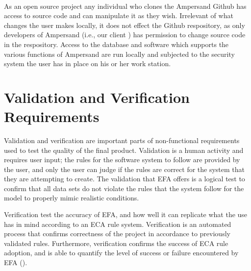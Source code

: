 \documentclass[12pt]{report}
\begin{document}
\paragraph*{}
As an open source project any individual who clones the Ampersand Github has access to source code 
and can manipulate it as they wish. Irrelevant of what changes the user makes locally, it does not 
effect the Github respository, as only developers of Ampersand \big(i.e., our client \big) has 
permission to change source code in the respository. Access to the database and software which 
supports the various functions of Ampersand are run locally and subjected to the security system 
the user has in place on his or her work station.

\section{Validation and Verification Requirements}\label{sec:Verification}

\paragraph*{}
Validation and verification are important parts of non-functional requirements used to test the 
quality of the final product. Validation is a human activity and requires user input; the rules for 
the software system to follow are provided by the user, and only the user can judge if the rules 
are correct for the system that they are attempting to create. The validation that EFA offers is 
a logical test to confirm that all data sets do not violate the rules that the system follow for 
the model to properly mimic realistic conditions. 

Verification test the accuracy of EFA, and how well it can replicate what the use has in mind 
according to an ECA rule system. Verification is an automated process that confirms correctness 
of the project in accordance to previously validated rules. Furthermore, verification confirms the 
success of ECA rule adoption, and is able to quantify the level of success or failure 
encountered by EFA (\cite{RBD}). 
\end{document}
